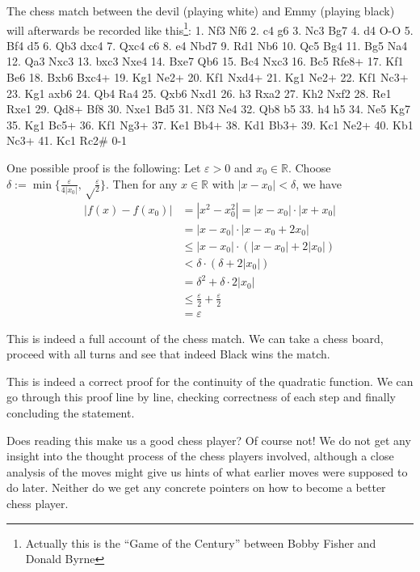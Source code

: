 \documentclass[11pt]{article}
\theoremstyle{plain}
\theoremstyle{definition}
\theoremstyle{remark}
\numberwithin{equation}{section}
\newcommand{\R}{\mathbb{R}}
\newcommand{\eps}{\varepsilon}
\begin{document}
\begin{paracol}{2}
\begin{nthcolumn*}{0}
The chess match between the devil (playing white) and Emmy (playing black) will afterwards be recorded like this\footnote{Actually this is the ``Game of the Century'' between Bobby Fisher and Donald Byrne}:
1. Nf3 Nf6 2. c4 g6 3. Nc3 Bg7 4. d4 O-O 5. Bf4 d5 6. Qb3 dxc4 7. Qxc4 c6 8. e4 Nbd7 9. Rd1 Nb6 10. Qc5 Bg4 11. Bg5 Na4 12. Qa3 Nxc3 13. bxc3 Nxe4 14. Bxe7 Qb6 15. Bc4 Nxc3 16. Bc5 Rfe8+ 17. Kf1 Be6 18. Bxb6 Bxc4+ 19. Kg1 Ne2+ 20. Kf1 Nxd4+ 21. Kg1 Ne2+ 22. Kf1 Nc3+ 23. Kg1 axb6 24. Qb4 Ra4 25. Qxb6 Nxd1 26. h3 Rxa2 27. Kh2 Nxf2 28. Re1 Rxe1 29. Qd8+ Bf8 30. Nxe1 Bd5 31. Nf3 Ne4 32. Qb8 b5 33. h4 h5 34. Ne5 Kg7 35. Kg1 Bc5+ 36. Kf1 Ng3+ 37. Ke1 Bb4+ 38. Kd1 Bb3+ 39. Kc1 Ne2+ 40. Kb1 Nc3+ 41. Kc1 Rc2\# 0-1
\end{nthcolumn*}
    \begin{nthcolumn}{1}
    One possible proof is the following: Let $\eps > 0$ and $x_0\in\R$. Choose $\delta := \min\{\frac{\eps}{4|x_0|},\sqrt\frac{\eps}{2}\}$. Then for any $x\in \R$ with $|x-x_0|<\delta$, we have
    \begin{align*}
        |f(x)-f(x_0)| &= |x^2-x_0^2| = |x-x_0|\cdot |x+x_0|\\
        &= |x-x_0|\cdot |x-x_0 + 2x_0|\\
        &\leq |x-x_0|\cdot (|x-x_0| + 2|x_0|)\\
        &< \delta\cdot (\delta + 2|x_0|)\\
        &= \delta^2 + \delta\cdot 2|x_0|\\
        &\leq \frac{\eps}{2} + \frac{\eps}{2}\\
        &=\eps
    \end{align*}
    \end{nthcolumn}  
\begin{nthcolumn*}{0}
This is indeed a full account of the chess match. We can take a chess board, proceed with all turns and see that indeed Black wins the match. 
\end{nthcolumn*}
    \begin{nthcolumn}{1}
    This is indeed a correct proof for the continuity of the quadratic function. We can go through this proof line by line, checking correctness of each step and finally concluding the statement. 
    \end{nthcolumn}  
\begin{nthcolumn*}{0}
Does reading this make us a good chess player? Of course not! We do not get any insight into the thought process of the chess players involved, although a close analysis of the moves might give us hints of what earlier moves were supposed to do later. Neither do we get any concrete pointers on how to become a better chess player. 

\end{nthcolumn*}
\end{paracol}
\end{document}

